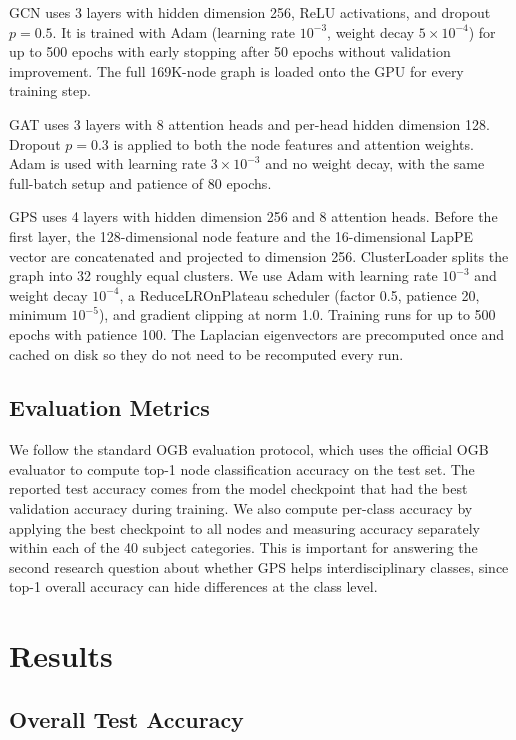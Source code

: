 \documentclass[conference]{IEEEtran}
\begin{document}
GCN uses 3 layers with hidden dimension 256, ReLU activations, and dropout $p=0.5$. It
is trained with Adam (learning rate $10^{-3}$, weight decay $5\times 10^{-4}$) for up to
500 epochs with early stopping after 50 epochs without validation improvement. The full
169K-node graph is loaded onto the GPU for every training step.

GAT uses 3 layers with 8 attention heads and per-head hidden dimension 128. Dropout
$p=0.3$ is applied to both the node features and attention weights. Adam is used with
learning rate $3\times 10^{-3}$ and no weight decay, with the same full-batch setup and
patience of 80 epochs.

GPS uses 4 layers with hidden dimension 256 and 8 attention heads. Before the first layer,
the 128-dimensional node feature and the 16-dimensional LapPE vector are concatenated
and projected to dimension 256. ClusterLoader splits the graph into 32 roughly equal
clusters. We use Adam with learning rate $10^{-3}$ and weight decay $10^{-4}$, a
ReduceLROnPlateau scheduler (factor 0.5, patience 20, minimum $10^{-5}$), and gradient
clipping at norm 1.0. Training runs for up to 500 epochs with patience 100. The Laplacian
eigenvectors are precomputed once and cached on disk so they do not need to be recomputed
every run.

\subsection{Evaluation Metrics}

We follow the standard OGB evaluation protocol, which uses the official OGB evaluator to
compute top-1 node classification accuracy on the test set. The reported test accuracy
comes from the model checkpoint that had the best validation accuracy during training.
We also compute per-class accuracy by applying the best checkpoint to all nodes and
measuring accuracy separately within each of the 40 subject categories. This is important
for answering the second research question about whether GPS helps interdisciplinary
classes, since top-1 overall accuracy can hide differences at the class level.

\section{Results}
\label{sec:results}

\subsection{Overall Test Accuracy}
\end{document}
